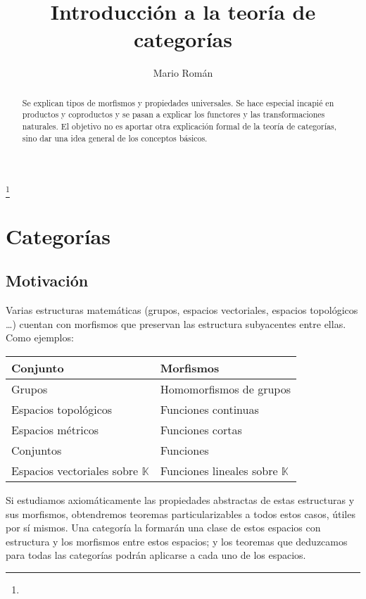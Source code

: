 \documentclass[a4paper, 11pt]{amsart}
\theoremstyle{definition}
\theoremstyle{remark}
\numberwithin{equation}{section}
\begin{document}
\title{Introducción a la teoría de categorías}


\author{Mario Román}
\address{}
\curraddr{}
\email{}
\thanks{}


\keywords{}

\date{}

\dedicatory{}


\begin{abstract}
  Se explican tipos de morfismos y propiedades universales. Se hace especial incapié en productos y
  coproductos y se pasan a explicar los functores y las transformaciones naturales.
  El objetivo no es aportar otra explicación formal de la teoría de categorías, sino dar una idea
  general de los conceptos básicos.
\end{abstract}

\maketitle

\section {Categorías}
  \subsection {Motivación}
    Varias estructuras matemáticas (grupos, espacios vectoriales, espacios topológicos \dots) cuentan
    con morfismos que preservan las estructura subyacentes entre ellas. Como ejemplos:
    \begin {center}
    \begin{tabular}{l|l}
      Conjunto & Morfismos \\
      \hline
      Grupos & Homomorfismos de grupos \\
      Espacios topológicos & Funciones continuas \\
      Espacios métricos & Funciones cortas \\
      Conjuntos & Funciones \\
      Espacios vectoriales sobre $\mathbb{K}$ & Funciones lineales sobre $\mathbb{K}$ \\
    \end{tabular}
    \end{center}
    Si estudiamos axiomáticamente las propiedades abstractas de estas estructuras y sus morfismos,
    obtendremos teoremas particularizables a todos estos casos, útiles por sí mismos.
    Una categoría la formarán una clase de estos espacios con estructura y los morfismos entre estos
    espacios; y los teoremas que deduzcamos para todas las categorías podrán aplicarse a cada uno de
    los espacios.
    
\end{document}
